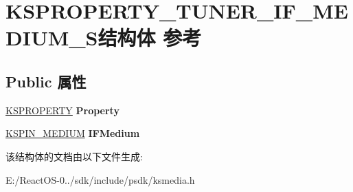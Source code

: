 \hypertarget{struct_k_s_p_r_o_p_e_r_t_y___t_u_n_e_r___i_f___m_e_d_i_u_m___s}{}\section{K\+S\+P\+R\+O\+P\+E\+R\+T\+Y\+\_\+\+T\+U\+N\+E\+R\+\_\+\+I\+F\+\_\+\+M\+E\+D\+I\+U\+M\+\_\+\+S结构体 参考}
\label{struct_k_s_p_r_o_p_e_r_t_y___t_u_n_e_r___i_f___m_e_d_i_u_m___s}
\subsection*{Public 属性}
\begin{DoxyCompactItemize}
\item 
\mbox{\label{struct_k_s_p_r_o_p_e_r_t_y___t_u_n_e_r___i_f___m_e_d_i_u_m___s_a926e97ba6be227310a8b23513703f9a4}} 
\hyperlink{struct_k_s_i_d_e_n_t_i_f_i_e_r}{K\+S\+P\+R\+O\+P\+E\+R\+TY} {\bfseries Property}
\item 
\mbox{\label{struct_k_s_p_r_o_p_e_r_t_y___t_u_n_e_r___i_f___m_e_d_i_u_m___s_ae9abba34bcbc18be48c64c51cd7f0d16}} 
\hyperlink{struct_k_s_i_d_e_n_t_i_f_i_e_r}{K\+S\+P\+I\+N\+\_\+\+M\+E\+D\+I\+UM} {\bfseries I\+F\+Medium}
\end{DoxyCompactItemize}


该结构体的文档由以下文件生成\+:\begin{DoxyCompactItemize}
\item 
E\+:/\+React\+O\+S-\/0../sdk/include/psdk/ksmedia.\+h\end{DoxyCompactItemize}
